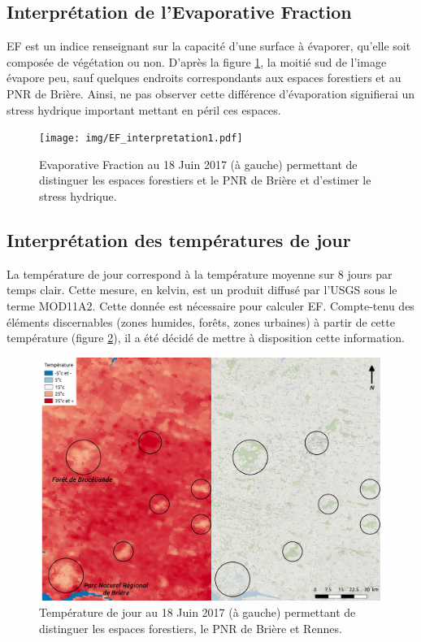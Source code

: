 \documentclass[10pt,a4paper]{article}
\begin{document}
\subsection{Interprétation de l'Evaporative Fraction}

EF est un indice renseignant sur la capacité d'une surface à évaporer, qu’elle soit composée de végétation ou non. D'après la figure \ref{EF1}, la moitié sud de l'image évapore peu, sauf quelques endroits correspondants aux espaces forestiers et au PNR de Brière. Ainsi, ne pas observer cette différence d'évaporation signifierai un stress hydrique important mettant en péril ces espaces.

\begin{figure}[!h]
\centering
\texttt{[image: img/EF\_interpretation1.pdf]}
\caption{Evaporative Fraction au 18 Juin 2017 (à gauche) permettant de distinguer les espaces forestiers et le PNR de Brière et d'estimer le stress hydrique.}
\label{EF1}
\end{figure}

\newpage 

\subsection{Interprétation des températures de jour}

La température de jour correspond à la température moyenne sur 8 jours par temps clair. Cette mesure, en kelvin, est un produit diffusé par l'USGS sous le terme MOD11A2. Cette donnée est nécessaire pour calculer EF. Compte-tenu des éléments discernables (zones humides, forêts, zones urbaines) à partir de cette température (figure \ref{TJ1}), il a été décidé de mettre à disposition cette information.\smallbreak

\begin{figure}[!h]
\centering
\includegraphics[scale=0.33]{img/TJ_interpretation1.pdf}
\caption{Température de jour au 18 Juin 2017 (à gauche) permettant de distinguer les espaces forestiers, le PNR de Brière et Rennes.}
\label{TJ1}
\end{figure}
\end{document}
